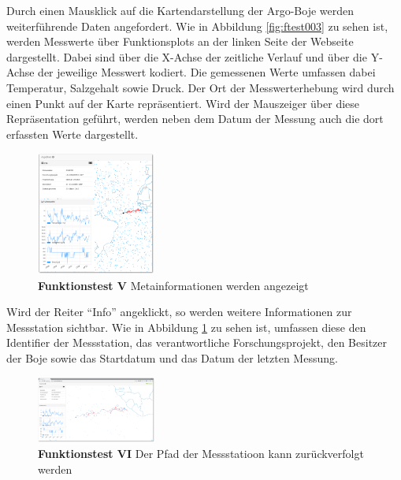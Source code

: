 Durch einen Mausklick auf die Kartendarstellung der Argo-Boje werden weiterführende Daten angefordert. Wie in Abbildung \ref{fig:ftest003} zu sehen ist, werden  Messwerte  über Funktionsplots an der linken Seite der Webseite dargestellt. Dabei sind über die X-Achse der zeitliche Verlauf und über die Y-Achse der jeweilige Messwert kodiert. Die gemessenen Werte umfassen dabei Temperatur, Salzgehalt sowie Druck.  Der Ort der Messwerterhebung wird durch einen Punkt auf der Karte repräsentiert. Wird der Mauszeiger über diese Repräsentation geführt, werden neben dem Datum der Messung auch die dort erfassten Werte dargestellt.

\newpage

\begin{figure}
 \centering
 \includegraphics[width=0.35\textwidth]{pix/ftest/003b.png}

 \caption{\textbf{Funktionstest V} Metainformationen werden angezeigt}
 \label{fig:ftest003b}
\end{figure}

Wird der Reiter "`Info"' angeklickt, so werden weitere Informationen zur Messstation sichtbar. Wie in Abbildung \ref{fig:ftest003b} zu sehen ist,  umfassen diese den Identifier der Messstation, das verantwortliche Forschungsprojekt, den Besitzer der Boje sowie das Startdatum und das Datum der letzten Messung.
\newline\newline\newline\newline
\newline\newline\newline


\begin{figure}
 \centering
 \includegraphics[width=0.35\textwidth]{pix/ftest/004.png}

 \caption{\textbf{Funktionstest VI} Der Pfad der Messstatioon kann zurückverfolgt werden}
 \label{fig:ftest004}
\end{figure}

